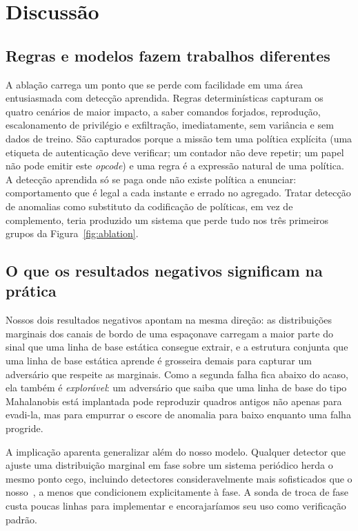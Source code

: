\documentclass[conference]{IEEEtran}
\begin{document}
\section{Discussão}

\subsection{Regras e modelos fazem trabalhos diferentes}

A ablação carrega um ponto que se perde com facilidade em uma área entusiasmada com
detecção aprendida. Regras determinísticas capturam os quatro cenários de maior
impacto, a saber comandos forjados, reprodução, escalonamento de privilégio e
exfiltração, imediatamente, sem variância e sem dados de treino. São
capturados porque a missão tem uma política explícita (uma etiqueta de
autenticação deve verificar; um contador não deve repetir; um papel não pode
emitir este \emph{opcode}) e uma regra é a expressão natural de uma política. A
detecção aprendida só se paga onde não existe política a enunciar: comportamento
que é legal a cada instante e errado no agregado. Tratar detecção de anomalias
como substituto da codificação de políticas, em vez de complemento, teria
produzido um sistema que perde tudo nos três primeiros grupos da
Figura~\ref{fig:ablation}.

\subsection{O que os resultados negativos significam na prática}

Nossos dois resultados negativos apontam na mesma direção: as distribuições
marginais dos canais de bordo de uma espaçonave carregam a maior parte do sinal
que uma linha de base estática consegue extrair, e a estrutura conjunta que uma
linha de base estática aprende é grosseira demais para capturar um adversário
que respeite as marginais. Como a segunda falha fica abaixo do acaso, ela
também é \emph{explorável}: um adversário que saiba que uma linha de base do
tipo Mahalanobis está implantada pode reproduzir quadros antigos não apenas para
evadi-la, mas para empurrar o escore de anomalia para baixo enquanto uma falha
progride.

A implicação aparenta generalizar além do nosso modelo. Qualquer detector
que ajuste uma distribuição marginal em fase sobre um sistema periódico herda o
mesmo ponto cego, incluindo detectores consideravelmente mais sofisticados que o
nosso~\cite{hundman2018lstm,yairi2017datadriven}, a menos que condicionem
explicitamente à fase. A sonda de troca de fase custa poucas linhas para
implementar e encorajaríamos seu uso como verificação padrão.
\end{document}
